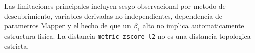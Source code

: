 Las limitaciones principales incluyen sesgo observacional por metodo de descubrimiento, variables derivadas no independientes, dependencia de parametros Mapper y el hecho de que un $\beta_1$ alto no implica automaticamente estructura fisica. La distancia \texttt{metric\_zscore\_l2} no es una distancia topologica estricta.

